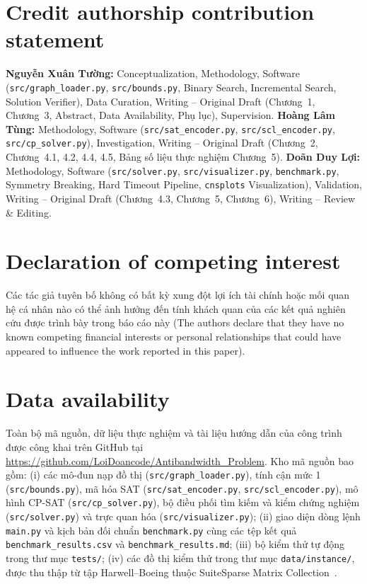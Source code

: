 \documentclass[a4paper,fleqn]{cas-sc}
\begin{document}
\section*{Credit authorship contribution statement}
\textbf{Nguyễn Xuân Tường:} Conceptualization, Methodology, Software (\texttt{src/graph\_loader.py}, \texttt{src/bounds.py}, Binary Search, Incremental Search, Solution Verifier), Data Curation, Writing -- Original Draft (Chương~1, Chương~3, Abstract, Data Availability, Phụ lục), Supervision. \textbf{Hoàng Lâm Tùng:} Methodology, Software (\texttt{src/sat\_encoder.py}, \texttt{src/scl\_encoder.py}, \texttt{src/cp\_solver.py}), Investigation, Writing -- Original Draft (Chương~2, Chương~4.1, 4.2, 4.4, 4.5, Bảng số liệu thực nghiệm Chương~5). \textbf{Doãn Duy Lợi:} Methodology, Software (\texttt{src/solver.py}, \texttt{src/visualizer.py}, \texttt{benchmark.py}, Symmetry Breaking, Hard Timeout Pipeline, \texttt{cnsplots} Visualization), Validation, Writing -- Original Draft (Chương~4.3, Chương~5, Chương~6), Writing -- Review \& Editing.

\section*{Declaration of competing interest}
Các tác giả tuyên bố không có bất kỳ xung đột lợi ích tài chính hoặc mối quan hệ cá nhân nào có thể ảnh hưởng đến tính khách quan của các kết quả nghiên cứu được trình bày trong báo cáo này (The authors declare that they have no known competing financial interests or personal relationships that could have appeared to influence the work reported in this paper).

\section*{Data availability}
Toàn bộ mã nguồn, dữ liệu thực nghiệm và tài liệu hướng dẫn của công trình được công khai trên GitHub tại \url{https://github.com/LoiDoancode/Antibandwidth_Problem}. Kho mã nguồn bao gồm: (i) các mô-đun nạp đồ thị (\texttt{src/graph\_loader.py}), tính cận mức 1 (\texttt{src/bounds.py}), mã hóa SAT (\texttt{src/sat\_encoder.py}, \texttt{src/scl\_encoder.py}), mô hình CP-SAT (\texttt{src/cp\_solver.py}), bộ điều phối tìm kiếm và kiểm chứng nghiệm (\texttt{src/solver.py}) và trực quan hóa (\texttt{src/visualizer.py}); (ii) giao diện dòng lệnh \texttt{main.py} và kịch bản đối chuẩn \texttt{benchmark.py} cùng các tệp kết quả \texttt{benchmark\_results.csv} và \texttt{benchmark\_results.md}; (iii) bộ kiểm thử tự động trong thư mục \texttt{tests/}; (iv) các đồ thị kiểm thử trong thư mục \texttt{data/instance/}, được thu thập từ tập Harwell--Boeing thuộc SuiteSparse Matrix Collection~\cite{harwellboeing}.
\end{document}
